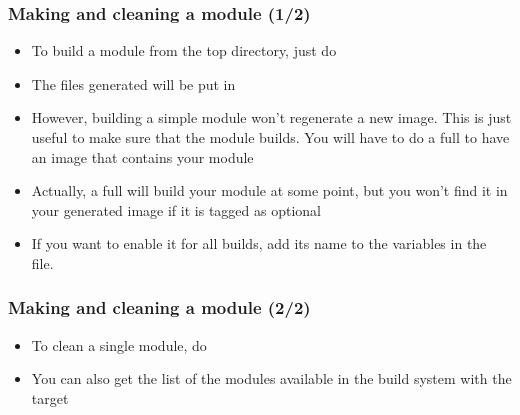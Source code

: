 \begin{frame}
  \frametitle{Making and cleaning a module (1/2)}
  \begin{itemize}
  \item To build a module from the top directory, just do
  \item The files generated will be put in
  \item However, building a simple module won't regenerate a new image.
    This is just useful to make sure that the module builds.
    You will have to do a full  to have an image that contains
    your module
  \item Actually, a full  will build your module at some
    point, but you won't find it in your generated image if it is
    tagged as optional
  \item If you want to enable it for all builds, add its name to the
     variables in the
     file.
  \end{itemize}
\end{frame}

\begin{frame}
  \frametitle{Making and cleaning a module (2/2)}
  \begin{itemize}
  \item To clean a single module, do 
  \item You can also get the list of the modules available in the
    build system with the  target
  \end{itemize}
\end{frame}
